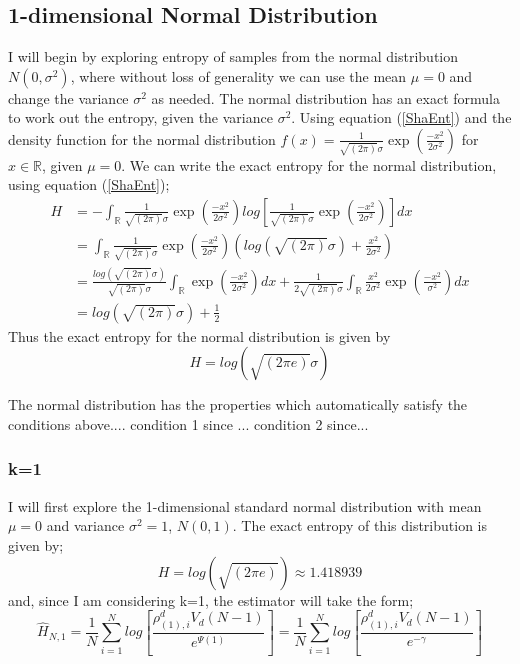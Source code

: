 \documentclass{article}
\begin{document}
\subsection{1-dimensional Normal Distribution}

I will begin by exploring entropy of samples from the normal distribution $N(0, \sigma^2)$, where without loss of generality we can use the mean $\mu = 0$ and change the variance $\sigma^2$ as needed. The normal distribution has an exact formula to work out the entropy, given the variance $\sigma^2$. Using equation (\ref{ShaEnt}) and the density function for the normal distribution $f(x) = \frac{1}{\sqrt{(2\pi)} \sigma}\exp{ \left( \frac{-x^2}{2\sigma^2} \right)}$ for $x \in \mathbb{R}$, given $\mu = 0$. We can write the exact entropy for the normal distribution, using equation (\ref{ShaEnt});
\begin{align}
H &= - \int_{\mathbb{R}} \frac{1}{\sqrt{(2\pi)} \sigma}\exp{ \left( \frac{-x^2}{2\sigma^2} \right)} log \left[\frac{1}{\sqrt{(2\pi)} \sigma}\exp{ \left( \frac{-x^2}{2\sigma^2} \right)} \right] dx \nonumber \\
&=  \int_{\mathbb{R}} \frac{1}{\sqrt{(2\pi)} \sigma}\exp{ \left( \frac{-x^2}{2\sigma^2} \right)} \left( log(\sqrt{(2\pi)}\sigma) +  \frac{x^2}{2\sigma^2} \right) \nonumber \\
&= \frac{log(\sqrt{(2\pi)}\sigma)}{\sqrt{(2\pi)} \sigma} \int_{\mathbb{R}} \exp{ \left( \frac{-x^2}{2\sigma^2} \right)} dx +  \frac{1}{2\sqrt{(2\pi)} \sigma} \int_{\mathbb{R}} \frac{x^2}{2\sigma^2}  \exp{ \left( \frac{-x^2}{\sigma^2} \right)} dx \nonumber \\
&=  log(\sqrt{(2\pi)}\sigma) + \frac{1}{2} \nonumber 
\end{align}
Thus the exact entropy for the normal distribution is given by 
\begin{equation}\label{NormalEnt}
H =  log(\sqrt{(2\pi e)}\sigma) 
\end{equation}

The normal distribution has the properties which automatically satisfy the conditions above.... condition 1 since ... condition 2 since...



\subsubsection{k=1}
I will first explore the 1-dimensional standard normal distribution with mean $\mu = 0$ and variance $\sigma^2 = 1$, $N(0, 1)$. The exact entropy of this distribution is given by;
\begin{equation}
H = log(\sqrt{(2\pi e)}) \approx 1.418939
\end{equation}
and, since I am considering k=1, the estimator will take the form;
\begin{equation} \label{KLEstK=1}
\hat{H}_{N, 1} = \frac{1}{N} \sum_{i=1}^{N} log \left[ \frac{\rho_{(1),i}^{d} V_{d} (N-1)}{e^{\Psi(1)}} \right] = \frac{1}{N} \sum_{i=1}^{N} log \left[ \frac{\rho_{(1),i}^{d} V_{d} (N-1)}{e^{-\gamma}} \right]
\end{equation}
\end{document}
